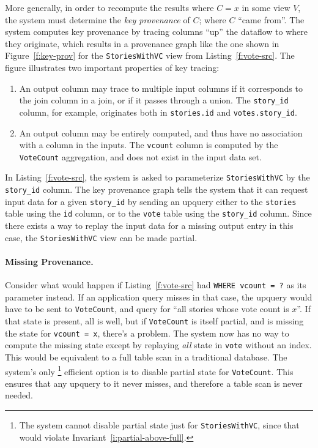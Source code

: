 More generally, in order to recompute the results where $C = x$ in some view
$V$, the system must determine the \textit{key provenance} of $C$; where $C$
``came from''. The system computes key provenance by tracing columns ``up'' the
dataflow to where they originate, which results in a provenance graph like the
one shown in Figure~\ref{f:key-prov} for the \texttt{StoriesWithVC} view from
Listing~\ref{f:vote-src}. The figure illustrates two important properties of
key tracing:

\begin{enumerate}
  \item An output column may trace to multiple input columns if it corresponds
    to the join column in a join, or if it passes through a union. The
    \texttt{story\_id} column, for example, originates both in
    \texttt{stories.id} and \texttt{votes.story\_id}.
  \item An output column may be entirely computed, and thus have no association
    with a column in the inputs. The \texttt{vcount} column is computed by the
    \texttt{VoteCount} aggregation, and does not exist in the input data set.
\end{enumerate}

In Listing~\ref{f:vote-src}, the system is asked to parameterize
\texttt{StoriesWithVC} by the \texttt{story\_id} column. The key provenance
graph tells the system that it can request input data for a given
\texttt{story\_id} by sending an upquery either to the \texttt{stories} table
using the \texttt{id} column, or to the \texttt{vote} table using the
\texttt{story\_id} column. Since there exists a way to replay the input data for
a missing output entry in this case, the \texttt{StoriesWithVC} view can be made
partial.

\paragraph{Missing Provenance.}
Consider what would happen if Listing~\ref{f:vote-src} had \texttt{WHERE vcount
= ?} as its parameter instead. If an application query misses in that case, the
upquery would have to be sent to \texttt{VoteCount}, and query for ``all stories
whose vote count is $x$''. If that state is present, all is well, but if
\texttt{VoteCount} is itself partial, and is missing the state for
\texttt{vcount = x}, there's a problem. The system now has no way to compute the
missing state except by replaying \emph{all} state in \texttt{vote} without an
index. This would be equivalent to a full table scan in a traditional database.
The system's only%
%
\footnote{The system cannot disable partial state just for
\texttt{StoriesWithVC}, since that would violate
Invariant~\ref{i:partial-above-full}.}
%
efficient option is to disable partial
state for \texttt{VoteCount}. This ensures that any upquery to it never misses,
and therefore a table scan is never needed.

